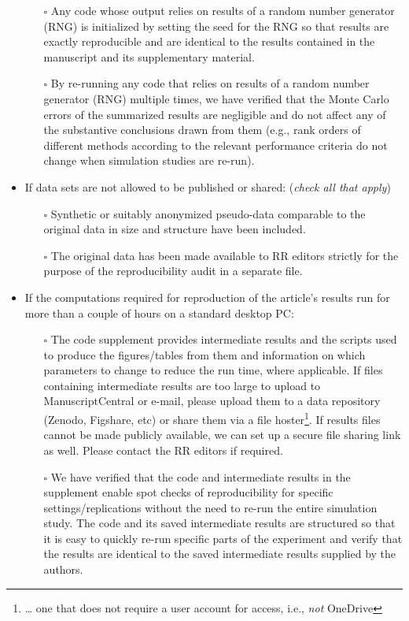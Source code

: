\documentclass[
  paper=a4,
  ,captions=tableheading
]{scrartcl}
\providecommand{\tightlist}{%
  \setlength{\itemsep}{0pt}\setlength{\parskip}{0pt}}
\begin{document}
\begin{itemize}
  \begin{itemize}
  \tightlist
  \item[$\square$]
    Any code whose output relies on results of a random number generator (RNG) is initialized by setting the seed for the RNG so that results are exactly reproducible and are identical to the results contained in the manuscript and its supplementary material.
  \item[$\square$]
    By re-running any code that relies on results of a random number generator (RNG) multiple times, we have verified that the Monte Carlo errors of the summarized results are negligible and do not affect any of the substantive conclusions drawn from them (e.g., rank orders of different methods according to the relevant performance criteria do not change when simulation studies are re-run).
  \end{itemize}
\item
  If data sets are not allowed to be published or shared: (\emph{check all that apply})

  \begin{itemize}
  \tightlist
  \item[$\square$]
    Synthetic or suitably anonymized pseudo-data comparable to the original data in size and structure have been included.
  \item[$\square$]
    The original data has been made available to RR editors strictly for the purpose of the reproducibility audit in a separate file.
  \end{itemize}
\item
  If the computations required for reproduction of the article's results run for more than a couple of hours on a standard desktop PC:

  \begin{itemize}
  \tightlist
  \item[$\square$]
    The code supplement provides intermediate results and the scripts used to produce the figures/tables from them and information on which parameters to change to reduce the run time, where applicable. If files containing intermediate results are too large to upload to ManuscriptCentral or e-mail, please upload them to a data repository (Zenodo, Figshare, etc) or share them via a file hoster\footnote{\ldots{} one that does not require a user account for access, i.e., \emph{not} OneDrive}. If results files cannot be made publicly available, we can set up a secure file sharing link as well. Please contact the RR editors if required.
  \item[$\square$]
    We have verified that the code and intermediate results in the supplement enable spot checks of reproducibility for specific settings/replications without the need to re-run the entire simulation study. The code and its saved intermediate results are structured so that it is easy to quickly re-run specific parts of the experiment and verify that the results are identical to the saved intermediate results supplied by the authors.
  \end{itemize}
\end{itemize}
\end{document}
